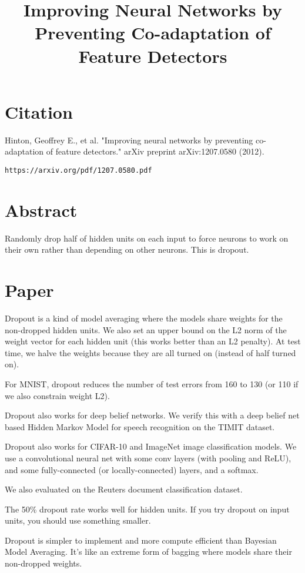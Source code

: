 \documentclass[a4paper]{article}
\title{Improving Neural Networks by Preventing
Co-adaptation of Feature Detectors}
\date{}
\begin{document}
\maketitle

\section{Citation}
Hinton, Geoffrey E., et al. "Improving neural networks by preventing co-adaptation of feature detectors." arXiv preprint arXiv:1207.0580 (2012).

\begin{verbatim}
https://arxiv.org/pdf/1207.0580.pdf
\end{verbatim}

\section{Abstract}
Randomly drop half of hidden units on each input to force neurons to work
on their own rather than depending on other neurons. This is dropout.

\section{Paper}
Dropout is a kind of model averaging where the models share weights for the
non-dropped hidden units. We also set an upper bound on the L2 norm of
the weight vector for each hidden unit (this works better than an L2 penalty).
At test time, we halve the weights because they are all turned on (instead of
half turned on).

For MNIST, dropout reduces the number of test errors from 160 to 130 (or 110
if we also constrain weight L2).

Dropout also works for deep belief networks. We verify this with a deep belief
net based Hidden Markov Model for speech recognition on the TIMIT dataset.

Dropout also works for CIFAR-10 and ImageNet image classification models. We
use a convolutional neural net with some conv layers (with pooling and ReLU),
and some fully-connected (or locally-connected) layers, and a softmax.

We also evaluated on the Reuters document classification dataset.

The 50\% dropout rate works well for hidden units. If you try dropout on
input units, you should use something smaller.

Dropout is simpler to implement and more compute efficient than Bayesian
Model Averaging. It's like an extreme form of bagging where models share their
non-dropped weights.
\end{document}
